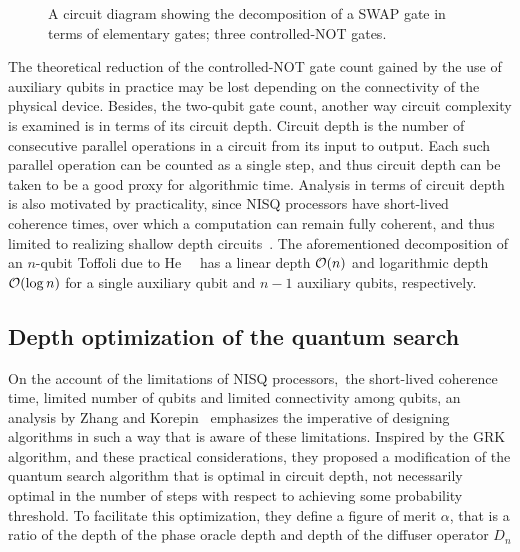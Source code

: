\begin{figure}[h]
    \centering
    \caption[A circuit diagram showing the decomposition of a SWAP gate in terms of elementary gates.]{A circuit diagram showing the decomposition of a SWAP gate in terms of elementary gates; three controlled-NOT gates.} 
\end{figure}

\noindent
The theoretical reduction of the controlled-NOT gate count gained by the use of auxiliary qubits in practice may be lost depending on the connectivity of the physical device. Besides, the two-qubit gate count, another way circuit complexity is examined is in terms of its circuit depth. Circuit depth is the number of consecutive parallel operations in a circuit from its input to output. Each such parallel operation can be counted as a single step, and thus circuit depth can be taken to be a good proxy for algorithmic time. Analysis in terms of circuit depth is also motivated by practicality, since \acs{NISQ} processors have short-lived coherence times, over which a computation can remain fully coherent, and thus limited to realizing shallow depth circuits~\cite{Preskill_2018}. The aforementioned decomposition of an $n$-qubit Toffoli due to He~\etal~\cite{He_2017} has a linear depth $\mathcal{O}(n)$ and logarithmic depth $\mathcal{O}(\log{n})$ for a single auxiliary qubit and $n-1$ auxiliary qubits, respectively.

\subsection{Depth optimization of the quantum search}
On the account of the limitations of \acs{NISQ} processors,~\ie the short-lived coherence time, limited number of qubits and limited connectivity among qubits, an analysis by Zhang and Korepin~\cite{Zhang_2020} emphasizes the imperative of designing algorithms in such a way that is aware of these limitations. Inspired by the \acs{GRK} algorithm, and these practical considerations, they proposed a modification of the quantum search algorithm that is optimal in circuit depth, not necessarily optimal in the number of steps with respect to achieving some probability threshold. To facilitate this optimization, they define a figure of merit $\alpha$, that is a ratio of the depth of the phase oracle depth and depth of the diffuser operator $D_n$

